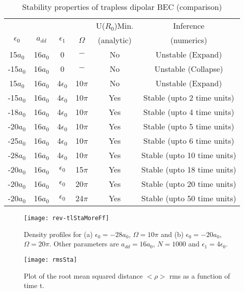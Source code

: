 \documentclass[amsmath,amssymb,article,twocolumn,superscriptaddress,showpacs,10pt]{revtex4-1}
\begin{document}
\begin{table}[!ht]
\caption{Stability properties of trapless dipolar BEC (comparison)}
\label{table2}
\begin{center}
\begin{tabular}{|c|c|c|c|c|c||}
\hline \hline
& & & & U($R_0$)Min. & Inference    \\
$\epsilon_0$  &$a_{dd}$ &$\epsilon_1$  &$\Omega$ & (analytic) & (numerics) \\
\hline \hline
 15$a_0$ &16$a_0$ &0             &$-$     &No  &Unstable (Expand)      \\
-15$a_0$ &16$a_0$ &0             &$-$     &No  &Unstable (Collapse)     \\ 
 15$a_0$ &16$a_0$ &4$\epsilon_0$ &10$\pi$ &No  &Unstable (Expand)    \\
-15$a_0$ &16$a_0$ &4$\epsilon_0$ &10$\pi$ &Yes &Stable (upto 2 time units)\\ 
-18$a_0$ &16$a_0$ &4$\epsilon_0$ &10$\pi$ &Yes &Stable (upto 4 time units)\\ 
-20$a_0$ &16$a_0$ &4$\epsilon_0$ &10$\pi$ &Yes &Stable  (upto 5 time units)\\
-25$a_0$ &16$a_0$ &4$\epsilon_0$ &10$\pi$ &Yes &Stable  (upto 6 time units)\\
-28$a_0$ &16$a_0$ &4$\epsilon_0$ &10$\pi$ &Yes &Stable  (upto 10 time units)\\ 
-20$a_0$ &16$a_0$ &$\epsilon_0$  &15$\pi$ &Yes &Stable (upto 18 time units) \\ 
-20$a_0$ &16$a_0$ &$\epsilon_0$  &20$\pi$ &Yes &Stable (upto 20 time units) \\ 
-20$a_0$ &16$a_0$ &$\epsilon_0$  &24$\pi$ &Yes &Stable (upto 50 time units) \\
\hline\hline
\end{tabular}
\end{center}
\end{table} 

\begin{figure}[h!]
\begin{center}
 \texttt{[image: rev-tlStaMoreFf]}
\end{center}
\caption{Density profiles for (a) $\epsilon_0=-28a_0$, $\Omega=10\pi$ and (b) $\epsilon_0=-20a_0$, $\Omega=20\pi$. Other parameters are $a_{dd}=16 a_0$, $N=1000$ and $\epsilon_1=4\epsilon_0$.}
\label{fig:nu2}
\end{figure}

\begin{figure}[h!]
\begin{center}
\texttt{[image: rmsSta]}
\end{center}
\caption{Plot of the root mean squared distance $<\rho>$ rms as a function of time t.}
\label{fig:nu2rms}
\end{figure}
\end{document}
